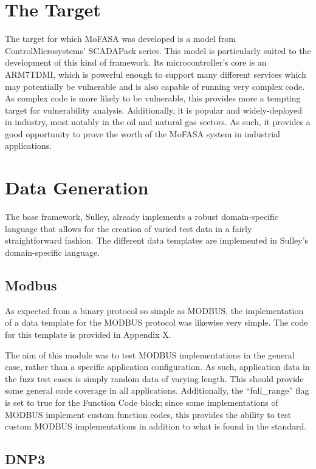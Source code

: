 \documentclass{report}
\begin{document}
\section{The Target}

The target for which MoFASA was developed is a model from ControlMicrosystems' SCADAPack series. This model is particularly suited to
the development of this kind of framework. Its microcontroller's core is an ARM7TDMI, which is powerful enough to support many different
services which may potentially be vulnerable and is also capable of running very complex code. As complex code is more likely to be vulnerable,
this provides more a tempting target for vulnerability analysis. Additionally, it is popular and widely-deployed in industry, most notably in the
oil and natural gas sectors. As such, it provides a good opportunity to prove the worth of the MoFASA system in industrial applications.

\section{Data Generation}

The base framework, Sulley, already implements a robust domain-specific language that allows for the creation of varied test data
in a fairly straightforward fashion. The different data templates are implemented in Sulley's domain-specific language.

\subsection{Modbus}

As expected from a binary protocol so simple as MODBUS, the implementation of a data template for the MODBUS protocol was likewise very
simple. The code for this template is provided in Appendix X.

The aim of this module was to test MODBUS implementations in the general case, rather than a specific application configuration. As such, application
data in the fuzz test cases is simply random data of varying length. This should provide some general code coverage in all applications. Additionally,
the ``full\_range'' flag is set to true for the Function Code block; since some implementations of MODBUS implement custom function codes, this provides
the ability to test custom MODBUS implementations in addition to what is found in the standard.

\subsection{DNP3}
\end{document}
